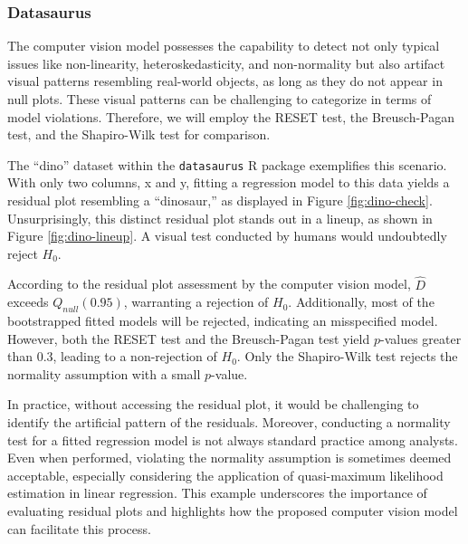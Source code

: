 \documentclass[]{interact}
\theoremstyle{plain}%
\theoremstyle{definition}
\theoremstyle{remark}
\begin{document}
\hypertarget{datasaurus}{%
\subsubsection{Datasaurus}\label{datasaurus}}

The computer vision model possesses the capability to detect not only
typical issues like non-linearity, heteroskedasticity, and non-normality
but also artifact visual patterns resembling real-world objects, as long
as they do not appear in null plots. These visual patterns can be
challenging to categorize in terms of model violations. Therefore, we
will employ the RESET test, the Breusch-Pagan test, and the Shapiro-Wilk
test \citep{shapiro1965analysis} for comparison.

The ``dino'' dataset within the \texttt{datasaurus} R package
exemplifies this scenario. With only two columns, x and y, fitting a
regression model to this data yields a residual plot resembling a
``dinosaur,'' as displayed in Figure \ref{fig:dino-check}.
Unsurprisingly, this distinct residual plot stands out in a lineup, as
shown in Figure \ref{fig:dino-lineup}. A visual test conducted by humans
would undoubtedly reject \(H_0\).

According to the residual plot assessment by the computer vision model,
\(\hat{D}\) exceeds \(Q_{null}(0.95)\), warranting a rejection of
\(H_0\). Additionally, most of the bootstrapped fitted models will be
rejected, indicating an misspecified model. However, both the RESET test
and the Breusch-Pagan test yield \(p\)-values greater than 0.3, leading
to a non-rejection of \(H_0\). Only the Shapiro-Wilk test rejects the
normality assumption with a small \(p\)-value.

In practice, without accessing the residual plot, it would be
challenging to identify the artificial pattern of the residuals.
Moreover, conducting a normality test for a fitted regression model is
not always standard practice among analysts. Even when performed,
violating the normality assumption is sometimes deemed acceptable,
especially considering the application of quasi-maximum likelihood
estimation in linear regression. This example underscores the importance
of evaluating residual plots and highlights how the proposed computer
vision model can facilitate this process.
\end{document}

